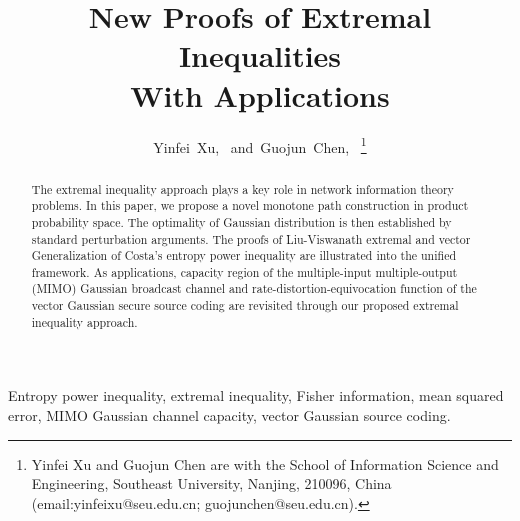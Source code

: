 \documentclass[journal,final, onecolumn]{IEEEtran}
\begin{document}
\sloppy
%
\title{New Proofs of Extremal Inequalities \\ With Applications}



\author{Yinfei~Xu,~
        and~Guojun~Chen,~
\thanks{Yinfei Xu and Guojun Chen are with the School of Information Science and Engineering, Southeast University, Nanjing, 210096, China (email:yinfeixu@seu.edu.cn; guojunchen@seu.edu.cn).}
}




\maketitle


\begin{abstract}
The extremal inequality approach plays a key role in network information theory problems. In this paper, we propose a novel monotone path construction in product probability space. The optimality of Gaussian distribution is then established by standard perturbation arguments. The proofs of Liu-Viswanath extremal and vector Generalization of Costa's entropy power inequality are illustrated into the unified framework. As applications, capacity region of the multiple-input multiple-output (MIMO) Gaussian broadcast channel and rate-distortion-equivocation function of the vector Gaussian secure source coding are revisited through our proposed extremal inequality approach.
\end{abstract}

\begin{IEEEkeywords}
Entropy power inequality, extremal inequality, Fisher information, mean squared error, MIMO Gaussian channel capacity, vector Gaussian source coding.
\end{IEEEkeywords}
\end{document}
